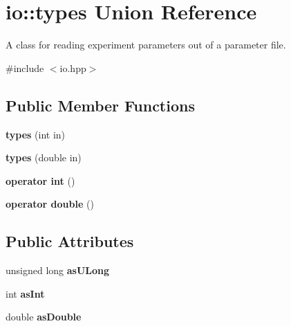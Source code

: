 \hypertarget{unionio_1_1types}{\section{io\-:\-:types Union Reference}
\label{unionio_1_1types}
}


A class for reading experiment parameters out of a parameter file.  




{\ttfamily \#include $<$io.\-hpp$>$}

\subsection*{Public Member Functions}
\begin{DoxyCompactItemize}
\item 
\hypertarget{unionio_1_1types_a91a6efe8a35b62181d858c919efc7948}{{\bfseries types} (int in)}\label{unionio_1_1types_a91a6efe8a35b62181d858c919efc7948}

\item 
\hypertarget{unionio_1_1types_a9d790549cd44ef300795179e51e2a54c}{{\bfseries types} (double in)}\label{unionio_1_1types_a9d790549cd44ef300795179e51e2a54c}

\item 
\hypertarget{unionio_1_1types_abbfc93592643c93666dcd37e50e110cd}{{\bfseries operator int} ()}\label{unionio_1_1types_abbfc93592643c93666dcd37e50e110cd}

\item 
\hypertarget{unionio_1_1types_aaddbc2205d65298d88da12a752143993}{{\bfseries operator double} ()}\label{unionio_1_1types_aaddbc2205d65298d88da12a752143993}

\end{DoxyCompactItemize}
\subsection*{Public Attributes}
\begin{DoxyCompactItemize}
\item 
\hypertarget{unionio_1_1types_aeb447411e6614731ea94a680fa06a16e}{unsigned long {\bfseries as\-U\-Long}}\label{unionio_1_1types_aeb447411e6614731ea94a680fa06a16e}

\item 
\hypertarget{unionio_1_1types_ac496701aa202e7561482839eff444ed6}{int {\bfseries as\-Int}}\label{unionio_1_1types_ac496701aa202e7561482839eff444ed6}

\item 
\hypertarget{unionio_1_1types_a02cfe6ea6a76b654839f2109e7c5517f}{double {\bfseries as\-Double}}\label{unionio_1_1types_a02cfe6ea6a76b654839f2109e7c5517f}

\end{DoxyCompactItemize}


